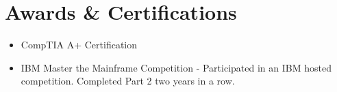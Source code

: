 \documentclass[margin]{res}
\begin{document}
\begin{resume}
\begin{tabular}{l p{3in}}
 \end{tabular}
 
\section{Awards \& Certifications}
\begin{itemize}
\item CompTIA A+ Certification
\item IBM Master the Mainframe Competition - Participated in an IBM hosted competition. Completed Part 2 two years in a row.
\end{itemize}


\end{resume} 
\end{document}
